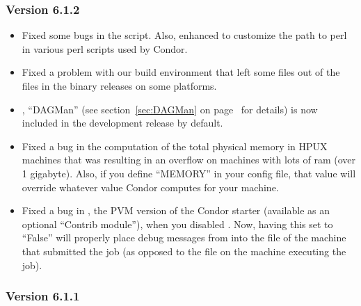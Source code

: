 \subsubsection{\label{sec:New-6-1-2}Version 6.1.2}

\begin{itemize}

\item Fixed some bugs in the  script.
Also, enhanced  to customize the path to perl in
various perl scripts used by Condor.

\item Fixed a problem with our build environment that left some files
out of the  files in the binary releases on some
platforms. 

\item {}, ``DAGMan'' (see section~\ref{sec:DAGMan} on 
page~\pageref{sec:DAGMan} for details) is now included in the
development release by default.

\item Fixed a bug in the computation of the total physical memory in
HPUX machines that was resulting in an overflow on machines with
lots of ram (over 1 gigabyte).
Also, if you define ``MEMORY'' in your config file, that value will
override whatever value Condor computes for your machine.

\item Fixed a bug in , the PVM version of the
Condor starter (available as an optional ``Contrib module''), when you
disabled .
Now, having this set to ``False'' will properly place debug messages
from  into the  file of the
machine that submitted the job (as opposed to the 
file on the machine executing the job).  

\end{itemize}


\subsubsection{\label{sec:New-6-1-1}Version 6.1.1}

